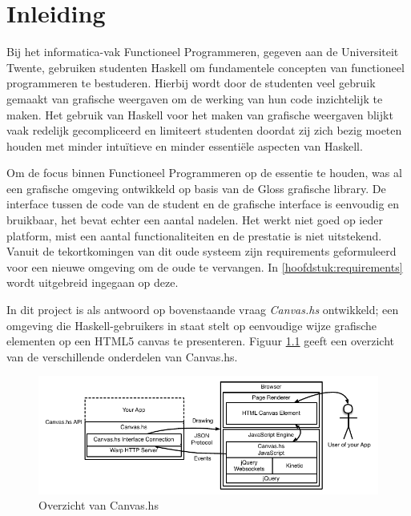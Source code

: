 \chapter{Inleiding}
Bij het informatica-vak Functioneel Programmeren, gegeven aan de Universiteit Twente, gebruiken studenten Haskell om fundamentele concepten van functioneel programmeren te bestuderen. Hierbij wordt door de studenten veel gebruik gemaakt van grafische weergaven om de werking van hun code inzichtelijk te maken. Het gebruik van Haskell voor het maken van grafische weergaven blijkt vaak redelijk gecompliceerd en limiteert studenten doordat zij zich bezig moeten houden met minder intuïtieve en minder essentiële aspecten van Haskell.

Om de focus binnen Functioneel Programmeren op de essentie te houden, was al een grafische omgeving ontwikkeld op basis van de Gloss grafische library. De interface tussen de code van de student en de grafische interface is eenvoudig en bruikbaar, het bevat echter een aantal nadelen. Het werkt niet goed op ieder platform, mist een aantal functionaliteiten en de prestatie is niet uitstekend. Vanuit de tekortkomingen van dit oude systeem zijn requirements geformuleerd voor een nieuwe omgeving om de oude te vervangen. In \autoref{hoofdstuk:requirements} wordt uitgebreid ingegaan op deze.

In dit project is als antwoord op bovenstaande vraag \emph{Canvas.hs} ontwikkeld; een omgeving die Haskell-gebruikers in staat stelt op eenvoudige wijze grafische elementen op een HTML5 canvas te presenteren. Figuur \ref{fig:overzicht_canvas.hs} geeft een overzicht van de verschillende onderdelen van Canvas.hs.

\begin{figure}
\begin{center}
\includegraphics[keepaspectratio,width=\textwidth]{./images/architectuur_overzicht.pdf}
\caption{Overzicht  van Canvas.hs}
\label{fig:overzicht_canvas.hs}
\end{center}
\end{figure}

